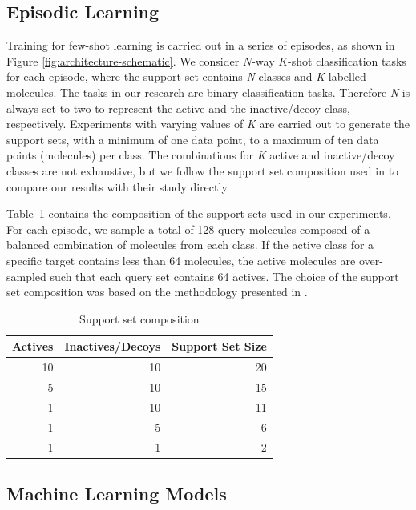 \subsection{Episodic Learning}

Training for few-shot learning is carried out in a series of episodes, as shown in Figure \ref{fig:architecture-schematic}. We consider $N$-way $K$-shot classification tasks for each episode, where the support set contains \textit{N} classes and \textit{K} labelled molecules. The tasks in our research are binary classification tasks. Therefore \textit{N} is always set to two to represent the active and the inactive/decoy class, respectively. Experiments with varying values of \textit{K} are carried out to generate the support sets, with a minimum of one data point, to a maximum of ten data points (molecules) per class. The combinations for \textit{K} active and inactive/decoy classes are not exhaustive, but we follow the support set composition used in \citet{altae2017low} to compare our results with their study directly.

Table~\ref{table:support-set-sizes} contains the composition of the support sets used in our experiments. For each episode, we sample a total of 128 query molecules composed of a balanced combination of molecules from each class. If the active class for a specific target contains less than 64 molecules, the active molecules are over-sampled such that each query set contains 64 actives. The choice of the support set composition was based on the methodology presented in \citet{altae2017low}.

\begin{table}
    \centering
    \begin{tabular}{@{}rrr@{}}
        \hline
        Actives & Inactives/Decoys & Support Set Size \\
        \hline
        10  & 10 & 20 \\
        5   & 10 & 15 \\
        1   & 10 & 11 \\
        1   & 5  & 6 \\
        1   & 1  & 2 \\
        \hline
    \end{tabular}
    \caption{Support set composition}
    \label{table:support-set-sizes}
\end{table}

\subsection{Machine Learning Models}

